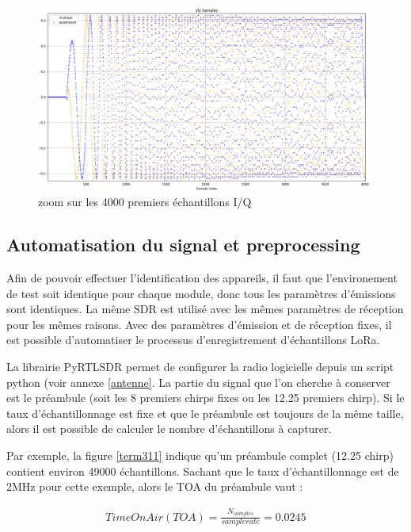 \newpage

\begin{figure}[h]
\centering

\includegraphics[scale=0.13]{images/iq2.png}
\caption{zoom sur les 4000 premiers échantillons I/Q}\label{term310}
\end{figure}

\subsection{Automatisation du signal et preprocessing}

Afin de pouvoir effectuer l'identification des appareils, il faut que l'environement de test soit identique pour chaque module, donc tous les paramètres d'émissions sont identiques. La même \ac{SDR} est utilisé avec les mêmes paramètres de réception pour les mêmes raisons. Avec des paramètres d'émission et de réception fixes, il est possible d'automatiser le processus d'enregistrement d'échantillons \ac{LoRa}.

La librairie PyRTLSDR permet de configurer la radio logicielle depuis un script python (voir annexe \ref{antenne}. La partie du signal que l'on cherche à conserver est le préambule (soit les 8 premiers chirps fixes ou les 12.25 premiers chirp). Si le taux d'échantillonnage est fixe et que le préambule est toujours de la même taille, alors il est possible de calculer le nombre d'échantillons à capturer. 

Par exemple, la figure \ref{term311} indique qu'un préambule complet (12.25 chirp) contient environ 49000 échantillons. Sachant que le taux d'échantillonnage est de 2MHz pour cette exemple, alors le \ac{TOA} du préambule vaut :

\begin{align}\label{toa}
    Time On Air (TOA) = \frac{N_{samples}}{sample rate} = 0.0245
\end{align}


